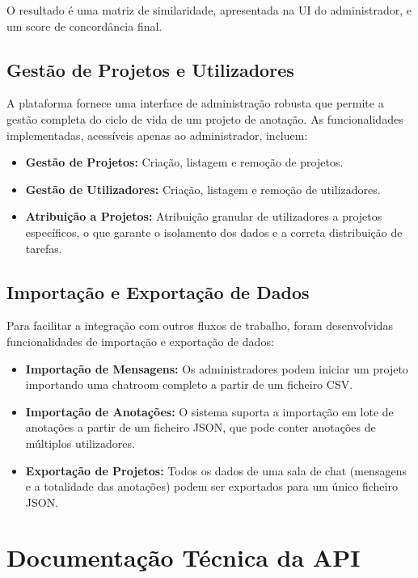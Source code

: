 O resultado é uma matriz de similaridade, apresentada na UI do administrador, e um score de concordância final.

\subsection{Gestão de Projetos e Utilizadores}

A plataforma fornece uma interface de administração robusta que permite a gestão completa do ciclo de vida de um projeto de anotação. As funcionalidades implementadas, acessíveis apenas ao administrador, incluem:
\begin{itemize}
    \item \textbf{Gestão de Projetos:} Criação, listagem e remoção de projetos.
    \item \textbf{Gestão de Utilizadores:} Criação, listagem e remoção de utilizadores.
    \item \textbf{Atribuição a Projetos:} Atribuição granular de utilizadores a projetos específicos, o que garante o isolamento dos dados e a correta distribuição de tarefas.
\end{itemize}

\subsection{Importação e Exportação de Dados}

Para facilitar a integração com outros fluxos de trabalho, foram desenvolvidas funcionalidades de importação e exportação de dados:
\begin{itemize}
    \item \textbf{Importação de Mensagens:} Os administradores podem iniciar um projeto importando uma chatroom completo a partir de um ficheiro CSV.
    \item \textbf{Importação de Anotações:} O sistema suporta a importação em lote de anotações a partir de um ficheiro JSON, que pode conter anotações de múltiplos utilizadores.
    \item \textbf{Exportação de Projetos:} Todos os dados de uma sala de chat (mensagens e a totalidade das anotações) podem ser exportados para um único ficheiro JSON.
\end{itemize}

\section{Documentação Técnica da API}

